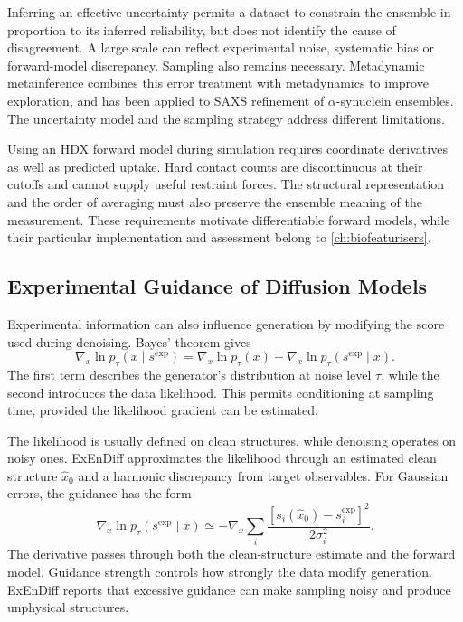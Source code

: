 Inferring an effective uncertainty permits a dataset to constrain the ensemble in proportion to its inferred reliability, but does not identify the cause of disagreement. A large scale can reflect experimental noise, systematic bias or forward-model discrepancy. Sampling also remains necessary. Metadynamic metainference combines this error treatment with metadynamics to improve exploration, and has been applied to SAXS refinement of $\alpha$-synuclein ensembles.\supercite{bonomiMetadynamicMetainferenceEnhanced2016,ahmedRefinementASynucleinEnsembles2021} The uncertainty model and the sampling strategy address different limitations.

Using an HDX forward model during simulation requires coordinate derivatives as well as predicted uptake. Hard contact counts are discontinuous at their cutoffs and cannot supply useful restraint forces. The structural representation and the order of averaging must also preserve the ensemble meaning of the measurement. These requirements motivate differentiable forward models, while their particular implementation and assessment belong to \cref{ch:biofeaturisers}.

\subsection{Experimental Guidance of Diffusion Models}
\label{sec:bg-guided-diffusion}

Experimental information can also influence generation by modifying the score used during denoising. Bayes' theorem gives
\begin{equation}
    \nabla_x\ln p_\tau(x\mid s^{\text{exp}})
    =\nabla_x\ln p_\tau(x)
    +\nabla_x\ln p_\tau(s^{\text{exp}}\mid x).
    \label{eq:bg-guided-score}
\end{equation}
The first term describes the generator's distribution at noise level $\tau$, while the second introduces the data likelihood. This permits conditioning at sampling time, provided the likelihood gradient can be estimated.\supercite{liuExEnDiffExperimentGuidedDiffusion2025}

The likelihood is usually defined on clean structures, while denoising operates on noisy ones. ExEnDiff approximates the likelihood through an estimated clean structure $\hat x_0$ and a harmonic discrepancy from target observables. For Gaussian errors, the guidance has the form
\begin{equation}
    \nabla_x\ln p_\tau(s^{\text{exp}}\mid x)
    \simeq-\nabla_x\sum_i
    \frac{[s_i(\hat x_0)-s_i^{\text{exp}}]^2}{2\sigma_i^2}.
    \label{eq:bg-guidance-restraint}
\end{equation}
The derivative passes through both the clean-structure estimate and the forward model. Guidance strength controls how strongly the data modify generation. ExEnDiff reports that excessive guidance can make sampling noisy and produce unphysical structures.\supercite{liuExEnDiffExperimentGuidedDiffusion2025}

